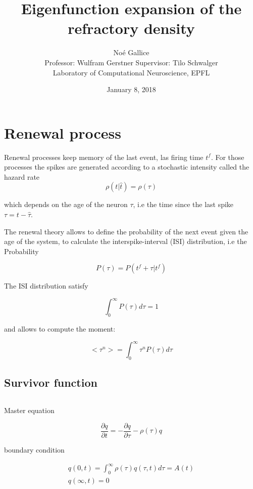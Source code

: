 \documentclass[a4paper,12pt,twoside]{article}
\title{Eigenfunction expansion of the refractory density}
\author{No\'e Gallice \\ Professor: Wulfram Gerstner \hspace{0.5cm}  Supervisor: Tilo Schwalger\\ \small{ Laboratory of Computational Neuroscience, EPFL }
}
\date{January 8, 2018}
\def \be {\begin{equation}}
\def \ee {\end{equation}}
\begin{document}
\maketitle

\tableofcontents %

\baselineskip=16pt
\parindent=15pt
\parskip=5pt


%
%
\newpage


\section{Renewal process}

Renewal processes keep memory of the last event, las firing time $t^f$. For those processes the spikes are generated according to a stochastic intensity called the hazard rate
\be
\rho(t|\hat{t})=\rho(\tau)
\ee

which depends on the age of the neuron $\tau$, i.e the time since the last spike $\tau=t-\hat{\tau}$.

The renewal theory allows to define the probability of the next event given the age of the system,  to calculate the interspike-interval (ISI) distribution, i.e the Probability 

\be 
P(\tau)=P(t^f+\tau| t^f)
\ee

The ISI distribution satisfy

\be 
\int_0^\infty P(\tau)d\tau=1 
\ee

and allows to compute the moment:


\be 
<\tau^n>=\int_0^\infty \tau^nP(\tau)d\tau
\ee



\subsection{Survivor function}

\be
\ee

Master equation

\be
\label{masterequation}
\frac{\partial q}{\partial t}=-\frac{\partial q}{\partial \tau}-\rho(\tau)q
\ee

boundary condition

\begin{align}
\label{boundarycondition}
q(0,t)=\int_{0}^{\infty}\rho(\tau)q(\tau,t)d\tau=A(t) \\
q(\infty,t)=0
\end{align}
\end{document}
